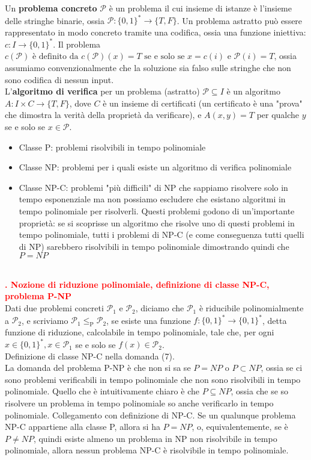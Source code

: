 \documentclass[12pt]{article}
\newcounter{questioncounter}
\newcommand{\question}[1]{
    \stepcounter{questioncounter}
    \textbf{\\\textcolor{red}{\arabic{questioncounter}. #1}}\\
}
\begin{document}
Un \textbf{problema concreto} $\mathcal{P}$ è un problema il cui insieme di istanze è l'insieme delle stringhe binarie, ossia $\mathcal{P}:\{0,1\}^{*}\rightarrow \{T,F\}$. Un problema astratto può essere rappresentato in modo concreto tramite una codifica, ossia una funzione iniettiva: $c:I\rightarrow \{0,1\}^{*}$. Il problema $c(\mathcal{P}) \text{ è definito da } c(\mathcal{P})(x)=T \text{ se e solo se } x=c(i) \text{ e } \mathcal{P}(i)=T$, ossia assumiamo convenzionalmente che la soluzione sia falso sulle stringhe che non sono codifica di nessun input.\\
L'\textbf{algoritmo di verifica} per un problema (astratto) $\mathcal{P}\subseteq I$ è un algoritmo $A:I\times C\rightarrow\{T,F\}$, dove $C$ è un insieme di certificati (un certificato è una "prova" che dimostra la verità della proprietà da verificare), e $A(x,y)=T$ per qualche $y$ se e solo se $x\in \mathcal{P}$.\\
\begin{itemize}
    \item Classe P: problemi risolvibili in tempo polinomiale
    \item Classe NP: problemi per i quali esiste un algoritmo di verifica polinomiale
    \item Classe NP-C: problemi "più difficili" di NP che sappiamo risolvere solo in tempo esponenziale ma non possiamo escludere che esistano algoritmi in tempo polinomiale per risolverli. Questi problemi godono di un'importante proprietà: se si scoprisse un algoritmo che risolve uno di questi problemi in tempo polinomiale, tutti i problemi di NP-C (e come conseguenza tutti quelli di NP) sarebbero risolvibili in tempo polinomiale dimostrando quindi che $P=NP$
\end{itemize}
\question{Nozione di riduzione polinomiale, definizione di classe NP-C, problema P-NP}
Dati due problemi concreti $\mathcal{P}_{1} \text{ e } \mathcal{P}_{2}$, diciamo che $\mathcal{P}_{1}$ è riducibile polinomialmente a $\mathcal{P}_{2}$, e scriviamo $\mathcal{P}_{1}\leq_{\text{P}}\mathcal{P}_{2}$, se esiste una funzione $f:\{0,1\}^{*}\rightarrow\{0,1\}^{*}$, detta funzione di riduzione, calcolabile in tempo polinomiale, tale che, per ogni $x\in\{0,1\}^{*}, x\in\mathcal{P}_{1}$ se e solo se $f(x)\in\mathcal{P}_{2}$.\\
Definizione di classe NP-C nella domanda (7).\\
La domanda del problema P-NP è che non si sa se $P=NP$ o $P\subset NP$, ossia se ci sono problemi verificabili in tempo polinomiale che non sono risolvibili in tempo polinomiale. Quello che è intuitivamente chiaro è che $P\subseteq NP$, ossia che se so risolvere un problema in tempo polinomiale so anche verificarlo in tempo polinomiale. Collegamento con definizione di NP-C. Se un qualunque problema NP-C appartiene alla classe P, allora si ha $P=NP$, o, equivalentemente, se è $P\neq NP$, quindi esiste almeno un problema in NP non risolvibile in tempo polinomiale, allora nessun problema NP-C è risolvibile in tempo polinomiale.\\
\end{document}
